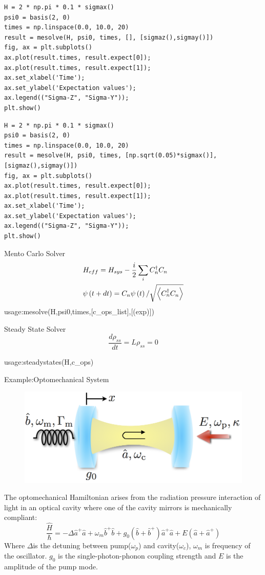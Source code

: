 \documentclass{beamer}
\begin{document}
\begin{lstlisting}
H = 2 * np.pi * 0.1 * sigmax()
psi0 = basis(2, 0)
times = np.linspace(0.0, 10.0, 20)
result = mesolve(H, psi0, times, [], [sigmaz(),sigmay()])
fig, ax = plt.subplots()
ax.plot(result.times, result.expect[0]);
ax.plot(result.times, result.expect[1]);
ax.set_xlabel('Time');
ax.set_ylabel('Expectation values');
ax.legend(("Sigma-Z", "Sigma-Y"));
plt.show()
\end{lstlisting}
\newpage
\begin{lstlisting}
H = 2 * np.pi * 0.1 * sigmax()
psi0 = basis(2, 0)
times = np.linspace(0.0, 10.0, 20)
result = mesolve(H, psi0, times, [np.sqrt(0.05)*sigmax()], [sigmaz(),sigmay()])
fig, ax = plt.subplots()
ax.plot(result.times, result.expect[0]);
ax.plot(result.times, result.expect[1]);
ax.set_xlabel('Time');
ax.set_ylabel('Expectation values');
ax.legend(("Sigma-Z", "Sigma-Y"));
plt.show()
\end{lstlisting}
\begin{frame}{Mento Carlo Solver}
\[\begin{gathered}
{H_{eff}} = {H_{sys}} - \frac{i}{2}\sum\limits_i {C_n^\dag {C_n}}  \hfill \\
\psi \left( {t + dt} \right) = {C_n}\psi \left( t \right)/\sqrt {\left\langle {C_n^\dag {C_n}} \right\rangle }  \hfill \\ 
\end{gathered} \]
usage:mesolve(H,psi0,times,[c\_ops\_list],[(exp)])
\end{frame}
\begin{frame}{Steady State Solver}
\[\frac{{d{\rho _{ss}}}}{{dt}} = L{\rho _{ss}} = 0\]

usage:steadystates(H,c\_ops)
\end{frame}
\begin{frame}{Example:Optomechanical System}
\begin{figure}
	\centering
	\includegraphics[width=0.5\linewidth]{download}
	\label{fig:download}
\end{figure}
The optomechanical Hamiltonian arises from the radiation pressure interaction of light in an optical cavity where one of the cavity mirrors is mechanically compliant:
$$\frac{\hat{H}}{\hbar}=-\Delta\hat{a}^{+}\hat{a}+\omega_{m}\hat{b}^{+}\hat{b}+g_{0}(\hat{b}+\hat{b}^{+})\hat{a}^{+}\hat{a}+E\left(\hat{a}+\hat{a}^{+}\right)$$
Where $\Delta$is the detuning between pump($\omega_{p}$) and cavity($\omega_c$), $\omega_{m}$ is frequency of the oscillator. $g_0$ is the single-photon-phonon coupling strength and $E$ is the amplitude of the pump mode.

\end{frame}
\end{document}
